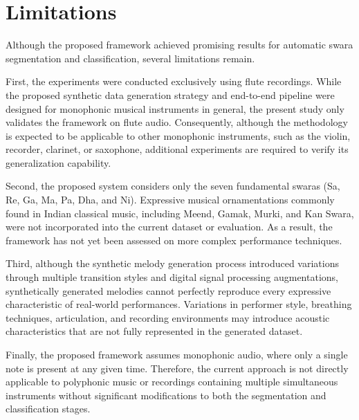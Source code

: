 \chapter{Limitations}
\label{ch:limitations}

Although the proposed framework achieved promising results for automatic swara segmentation and classification, several limitations remain.

First, the experiments were conducted exclusively using flute recordings. While the proposed synthetic data generation strategy and end-to-end pipeline were designed for monophonic musical instruments in general, the present study only validates the framework on flute audio. Consequently, although the methodology is expected to be applicable to other monophonic instruments, such as the violin, recorder, clarinet, or saxophone, additional experiments are required to verify its generalization capability.

Second, the proposed system considers only the seven fundamental swaras (Sa, Re, Ga, Ma, Pa, Dha, and Ni). Expressive musical ornamentations commonly found in Indian classical music, including Meend, Gamak, Murki, and Kan Swara, were not incorporated into the current dataset or evaluation. As a result, the framework has not yet been assessed on more complex performance techniques.

Third, although the synthetic melody generation process introduced variations through multiple transition styles and digital signal processing augmentations, synthetically generated melodies cannot perfectly reproduce every expressive characteristic of real-world performances. Variations in performer style, breathing techniques, articulation, and recording environments may introduce acoustic characteristics that are not fully represented in the generated dataset.

Finally, the proposed framework assumes monophonic audio, where only a single note is present at any given time. Therefore, the current approach is not directly applicable to polyphonic music or recordings containing multiple simultaneous instruments without significant modifications to both the segmentation and classification stages.
